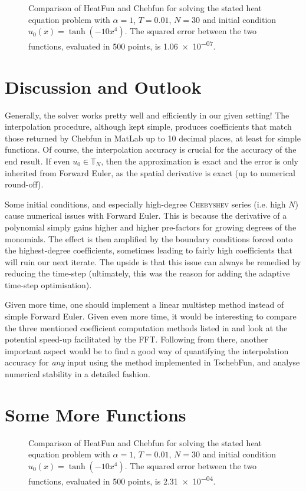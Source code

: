 \documentclass[12pt, a4paper]{article}
\newcommand{\chebyshev}{\textsc{Chebyshev}\xspace}
\newcommand{\tschebfun}{\textcolor{themecolor3}{TschebFun}\xspace}
\newcommand{\heatfun}{\textcolor{themecolor3}{HeatFun}\xspace}
\begin{document}
  \begin{figure}[H]
    \centering
    \caption{Comparison of \heatfun and Chebfun for solving the stated heat equation problem with $\alpha = 1$, $T = 0.01$, $N = 30$ and initial condition $u_0(x) = \tanh(-10x^4)$. The squared error between the two functions, evaluated in 500 points, is \num{1.06e-07}.}
  \end{figure}

  \section{Discussion and Outlook}
  Generally, the solver works pretty well and efficiently in our given setting!
  The interpolation procedure, although kept simple, produces coefficients that match those returned by Chebfun in MatLab up to 10 decimal places, at least for simple functions.
  Of course, the interpolation accuracy is crucial for the accuracy of the end result.
  If even $u_0 \in \mathbb{T}_N$, then the approximation is exact and the error is only inherited from Forward Euler, as the spatial derivative is exact (up to numerical round-off).

  Some initial conditions, and especially high-degree \chebyshev series (i.e. high $N$) cause numerical issues with Forward Euler.
  This is because the derivative of a polynomial simply gains higher and higher pre-factors for growing degrees of the monomials.
  The effect is then amplified by the boundary conditions forced onto the highest-degree coefficients, sometimes leading to fairly high coefficients that will ruin our next iterate.
  The upside is that this issue can always be remedied by reducing the time-step (ultimately, this was the reason for adding the adaptive time-step optimisation).

  Given more time, one should implement a linear multistep method instead of simple Forward Euler.
  Given even more time, it would be interesting to compare the three mentioned coefficient computation methods listed in  and look at the potential speed-up facilitated by the FFT.
  Following from there, another important aspect would be to find a good way of quantifying the interpolation accuracy for \textit{any} input using the method implemented in \tschebfun, and analyse numerical stability in a detailed fashion.

  \printbibliography

  \appendix
  \section{Some More Functions}
  \begin{figure}[H]
    \centering
    \caption{Comparison of \heatfun and Chebfun for solving the stated heat equation problem with $\alpha = 1$, $T = 0.01$, $N = 30$ and initial condition $u_0(x) = \tanh(-10x^4)$. The squared error between the two functions, evaluated in 500 points, is \num{2.31e-04}.}
  \end{figure}
\end{document}
